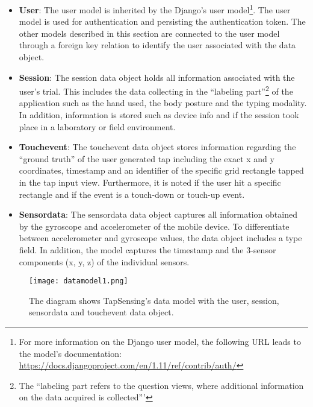 \begin{itemize}
  \item \textbf{User}: The user model is inherited by the Django's user model\footnote{For more information on the Django user model, the following URL leads to the model's documentation: \url{https://docs.djangoproject.com/en/1.11/ref/contrib/auth/}}. The user model is used for authentication and persisting the authentication token. The other models described in this section are connected to the user model through a foreign key relation to identify the user associated with the data object.
  \item \textbf{Session}: The session data object holds all information associated with the user's trial. This includes the data collecting in the ``labeling part''\footnote{The ``labeling part refers to the question views, where additional information on the data acquired is collected'''} of the application such as the hand used, the body posture and the typing modality. In addition, information is stored such as device info and if the session took place in a laboratory or field environment.
  \item \textbf{Touchevent}: The touchevent data object stores information regarding the ``ground truth'' of the user generated tap including the exact x and y coordinates, timestamp and an identifier of the specific grid rectangle tapped in the tap input view. Furthermore, it is noted if the user hit a specific rectangle and if the event is a touch-down or touch-up event.
  \item \textbf{Sensordata}: The sensordata data object captures all information obtained by the gyroscope and accelerometer of the mobile device. To differentiate between accelerometer and gyroscope values, the data object includes a type field. In addition, the model captures the timestamp and the 3-sensor components (x, y, z) of the individual sensors.
\end{itemize}

\begin{figure}[h!]
  \centering
  \texttt{[image: datamodel1.png]}
  \caption{The diagram shows TapSensing's data model with the user, session, sensordata and touchevent data object.} \label{fig:datamodel}
\end{figure}



